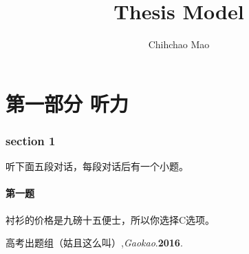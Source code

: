 \documentclass[a4paper 14pt]{article}
\title{\sanhao \SH Thesis Model}
\author{Chihchao Mao}
\date{}%
\newcommand{\xiaosihao}{\fontsize{12pt}{\baselineskip}\selectfont}  %
\numberwithin{figure}{section} %
\numberwithin{table}{section} %
\begin{document}
	\maketitle
	
	\tableofcontents%
	
	\clearpage
	
	
	\xiaosihao%
	

\part{第一部分 听力\cite{foo1}}
\section{section 1}
听下面五段对话，每段对话后有一个小题。\\
\subsection{第一题}
衬衫的价格是九磅十五便士，所以你选择C选项。



\newpage
\begin{thebibliography}{9}
	高考出题组（姑且这么叫）,\emph{Gaokao}.\textbf{2016}.
\end{thebibliography}
	
\end{document}
